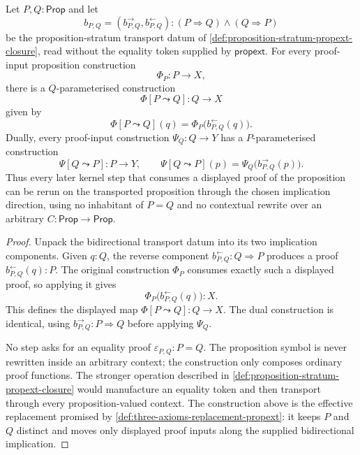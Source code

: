 \begin{theorem}
\label{thm:hsame-proposition-transport-bypasses-propext}
Let $P,Q:\mathsf{Prop}$ and let
$$
b_{P,Q}=(b^\rightarrow_{P,Q},b^\leftarrow_{P,Q}):(P\Rightarrow Q)\land(Q\Rightarrow P)
$$
be the proposition-stratum transport datum of \autoref{def:proposition-stratum-propext-closure}, read without the equality token supplied by $\mathsf{propext}$. For every proof-input proposition construction
$$
\Phi_P:P\to X,
$$
there is a $Q$-parameterised construction
$$
\Phi[P\leadsto Q]:Q\to X
$$
given by
$$
\Phi[P\leadsto Q](q)=\Phi_P\bigl(b^\leftarrow_{P,Q}(q)\bigr).
$$
Dually, every proof-input construction $\Psi_Q:Q\to Y$ has a $P$-parameterised construction
$$
\Psi[Q\leadsto P]:P\to Y,
\qquad
\Psi[Q\leadsto P](p)=\Psi_Q\bigl(b^\rightarrow_{P,Q}(p)\bigr).
$$
Thus every later kernel step that consumes a displayed proof of the proposition can be rerun on the transported proposition through the chosen implication direction, using no inhabitant of $P=Q$ and no contextual rewrite over an arbitrary $C:\mathsf{Prop}\to\mathsf{Prop}$.
\end{theorem}
\begin{proof}
Unpack the bidirectional transport datum into its two implication components. Given $q:Q$, the reverse component $b^\leftarrow_{P,Q}:Q\Rightarrow P$ produces a proof $b^\leftarrow_{P,Q}(q):P$. The original construction $\Phi_P$ consumes exactly such a displayed proof, so applying it gives
$$
\Phi_P\bigl(b^\leftarrow_{P,Q}(q)\bigr):X.
$$
This defines the displayed map $\Phi[P\leadsto Q]:Q\to X$. The dual construction is identical, using $b^\rightarrow_{P,Q}:P\Rightarrow Q$ before applying $\Psi_Q$.

No step asks for an equality proof $\varepsilon_{P,Q}:P=Q$. The proposition symbol is never rewritten inside an arbitrary context; the construction only composes ordinary proof functions. The stronger operation described in \autoref{def:proposition-stratum-propext-closure} would manufacture an equality token and then transport through every proposition-valued context. The construction above is the effective replacement promised by \autoref{def:three-axioms-replacement-propext}: it keeps $P$ and $Q$ distinct and moves only displayed proof inputs along the supplied bidirectional implication.
\end{proof}

